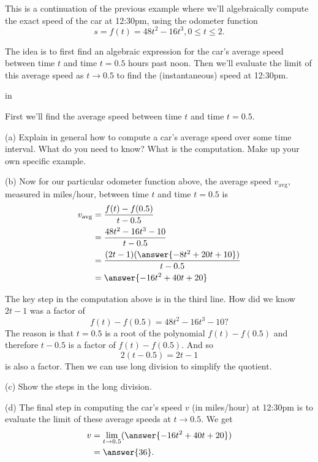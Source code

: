 \documentclass{ximera}
\newcommand{\pskip}{\vskip 0.1 in}
\begin{document}
\begin{example} \label{Exsdf4r55ytyh}
This is a continuation of the previous example where we'll algebraically compute the exact speed of the car at 12:30pm, using the odometer function
\[
     s = f(t) = 48t^2 - 16t^3, 0\leq t \leq 2.
\]

The idea is to first find an algebraic expression for the car's average speed between time $t$ and time $t=0.5$ hours past noon. Then we'll evaluate the limit of this average speed as $t\to 0.5$ to find the (instantaneous) speed at 12:30pm.

\pskip


\begin{question} \label{Q:43fggte}
First we'll find the average speed between time $t$ and time $t=0.5$. 

(a) Explain in general how to compute a car's average speed over some time interval. What do you need to know? What is the computation. Make up your own specific example.

(b) Now for our particular odometer function above, the average speed $v_{\text{avg}}$, measured in miles/hour, between time $t$ and time $t=0.5$ is
\begin{align*}
   v_{\text{avg}} &= \frac{f(t) - f(0.5)}{t - 0.5} \\
                        &= \frac{48t^2 - 16t^3 - 10 }{t-0.5} \\
                        &= \frac{(2t-1)(\answer{-8t^2 + 20t + 10})}{t-0.5} \\
                        & = \answer{-16t^2+40t + 20}
\end{align*}

The key step in the computation above is in the third line. How did we know $2t-1$ was a factor of 
\[
   f(t) - f(0.5) = 48t^2 - 16t^3 - 10 ?
\]  
The reason is that $t=0.5$ is a root of the polynomial $f(t)-f(0.5)$ and therefore $t - 0.5$ is a factor of $f(t)-f(0.5)$. And so 
\[
   2(t-0.5) = 2t-1
\]
is also a factor. Then we can use long division to simplify the quotient.

(c) Show the steps in the long division.

(d) The final step in computing the car's speed $v$ (in miles/hour) at 12:30pm is to evaluate the limit of these average speeds at $t\to 0.5$. We get
\begin{align*}
    v &= \lim_{t\to 0.5} (\answer{-16t^2+40t + 20}) \\
       & = \answer{36} .
\end{align*}

\end{question}



\end{example}
\end{document}
